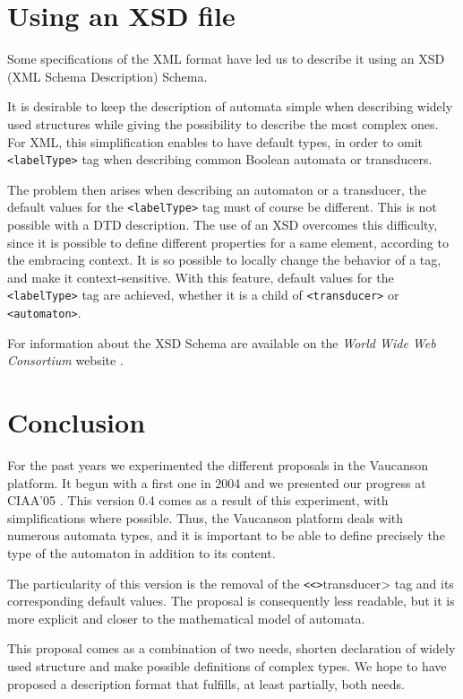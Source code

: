 \documentclass[a4paper]{article}
\newcommand{\Vauc}{{\sc Vaucanson}\xspace}
\newcommand{\xtag}[1]{\texttt{<#1>}}
\begin{document}
\section{Using an XSD file}

Some specifications of the XML format have led us to describe it using an XSD
(XML Schema Description) Schema.

It is desirable to keep the description of automata simple when
describing widely used structures while giving the possibility to
describe the most complex ones. For XML, this simplification enables
to have default types, in order to omit \xtag{labelType} tag when describing
common Boolean automata or transducers.

The problem then arises when describing an automaton or a transducer,
the default values for the \xtag{labelType} tag must of course be different.
This is not possible with a DTD description.  The use of an XSD
overcomes this difficulty, since it is possible to define different
properties for a same element, according to the embracing context. It
is so possible to locally change the behavior of a tag, and make it
context-sensitive. With this feature, default values for the
\xtag{labelType} tag are achieved, whether it is a child of
\xtag{transducer} or \xtag{automaton}.

For information about the XSD Schema are available on the
\textit{World Wide Web Consortium} website \cite{w3c.www}.

\section{Conclusion}

For the past years we experimented the different proposals in the
\Vauc platform. It begun with a first one in 2004 \cite{vaucanson.04.techrep}
and we presented our progress at CIAA'05 \cite{claveirole.05.ciaa}.
This version 0.4 comes as a result of this experiment, with
simplifications where possible. Thus, the \Vauc platform deals
with numerous automata types, and it is important to be able to define
precisely the type of the automaton in addition to its content.

The particularity of this version is the removal of the \xtag<transducer> tag
and its corresponding default values. The proposal is consequently less
readable, but it is more explicit and closer to the mathematical model
of automata.

This proposal comes as a combination of two needs, shorten declaration
of widely used structure and make possible definitions of complex
types. We hope to have proposed a description format that fulfills, at
least partially, both needs.

\nocite{lombardy.04.tcs}
\cite{claveirole.05.ciaa}
\cite{vaucanson.04.techrep}
\nocite{vaucanson.www.xml}
\cite{vaucanson.www.xsd}
\cite{w3c.www}




\end{document}
